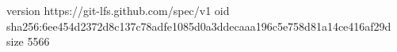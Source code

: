version https://git-lfs.github.com/spec/v1
oid sha256:6ee454d2372d8c137c78adfe1085d0a3ddecaaa196c5e758d81a14ce416af29d
size 5566
